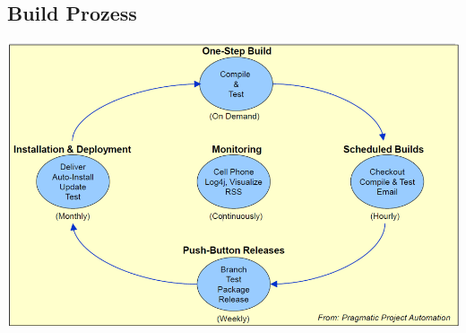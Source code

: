 \documentclass[10pt]{article}
\begin{document}
\subsection{Build Prozess}
\includegraphics{assets/buildprozess.png}



\end{document}
